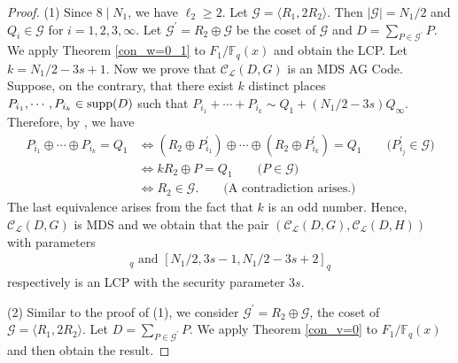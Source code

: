 \documentclass[journal,12pt,onecolumn]{IEEEtran}
\begin{document}
\begin{proof}
    (1) Since $8\mid N_1$, we have $\ell_2\ge 2$. Let $\mathcal{G} = \langle R_1, 2R_2\rangle$. Then $|\mathcal{G}| = N_1/2$ and $Q_i\in \mathcal{G}$ for $i=1,2,3,\infty$. Let $\mathcal{G}^\prime = R_2 \oplus \mathcal{G}$ be the coset of $\mathcal{G}$ and $D = \sum_{P\in \mathcal{G}^\prime} P$. We apply Theorem \ref{con_w=0_1} to $F_1/\mathbb{F}_q(x)$ and obtain the LCP. Let $k = N_1/2-3s+1$. Now we prove that $\mathcal{C}_{\mathcal{L}}(D,G)$ is an MDS AG Code. Suppose, on the contrary, that there exist $k$ distinct places $P_{i_1},\cdots,P_{i_k}\in{\rm supp}(D)$ such that $P_{i_1}+\cdots+ P_{i_k} \sim Q_1 + (N_1/2-3s)Q_\infty$. Therefore, by \cite[Prop. 6.1.7]{Algebraic_Function_Fields_and_Codes}, we have
    \begin{align*}
        P_{i_1}\oplus\cdots\oplus P_{i_k} = Q_1 &\Longleftrightarrow (R_2 \oplus P_{i_1}^\prime) \oplus\cdots\oplus (R_2 \oplus P_{i_k}^\prime) = Q_1 \qquad \big( P_{i_j}^\prime\in \mathcal{G} \big)\\
        & \Longleftrightarrow k R_2 \oplus P = Q_1 \qquad \big( P\in \mathcal{G} \big) \\
        & \Longleftrightarrow R_2 \in \mathcal{G}. \qquad\big( \text{A contradiction arises.} \big)
    \end{align*}
    The last equivalence arises from the fact that $k$ is an odd number. Hence, $\mathcal{C}_{\mathcal{L}}(D,G)$ is MDS and we obtain that the pair $(\mathcal{C}_{\mathcal{L}}(D,G),\mathcal{C}_{\mathcal{L}}(D,H))$ with parameters
    \begin{gather*}
        [N_1/2,N_1/2-3s+1,3s]_q\text{ and }[N_1/2,3s-1,N_1/2-3s+2]_q
    \end{gather*}
    respectively is an LCP with the security parameter $3s$. 

    (2) Similar to the proof of (1), we consider $\mathcal{G}^\prime = R_2 \oplus \mathcal{G}$, the coset of $\mathcal{G}= \langle R_1, 2R_2\rangle$. Let $D = \sum_{P\in \mathcal{G}^\prime} P$. We apply Theorem \ref{con_v=0} to $F_1/\mathbb{F}_q(x)$ and then obtain the result. 


\end{proof}
\end{document}
